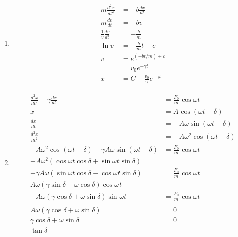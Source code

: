 \documentclass{article}
\begin{document}
\begin{enumerate}
  \item

        \begin{align*}
          m \frac{d^2 x}{d t^2}       & = -b \frac{d x}{d t}                   \\
          m \frac{d v}{d t}           & = -b v                                 \\
          \frac{1}{v} \frac{d v}{d t} & = -\frac{b}{m}                         \\
          \ln v                       & = -\frac{b}{m} t + c                   \\
          v                           & = e^{(-b t / m) + c}                   \\
                                      & = v_0 e^{-\gamma t}                    \\
          x                           & = C - \frac{v_0}{\gamma} e^{-\gamma t}
        \end{align*}

  \item

        \begin{align*}
          \frac{d^2 x}{d t^2} + \gamma \frac{d x}{d t}                                    & = \frac{F_0}{m} \cos \omega t          \\
          x                                                                               & = A \cos (\omega t - \delta)           \\
          \frac{d x}{d t}                                                                 & = -A \omega \sin (\omega t - \delta)   \\
          \frac{d^2 x}{d t^2}                                                             & = -A \omega^2 \cos (\omega t - \delta) \\
          -A \omega^2 \cos (\omega t - \delta) - \gamma A \omega \sin (\omega t - \delta) & = \frac{F_0}{m} \cos \omega t          \\
          -A \omega^2 (\cos \omega t \cos \delta + \sin \omega t \sin \delta)             &                                        \\
          - \gamma A \omega (\sin \omega t \cos \delta - \cos \omega t \sin \delta)       & = \frac{F_0}{m} \cos \omega t          \\
          A \omega (\gamma \sin \delta - \omega \cos \delta) \cos \omega t                &                                        \\
          - A \omega (\gamma \cos \delta + \omega \sin \delta) \sin \omega t              & = \frac{F_0}{m} \cos \omega t          \\ \\
          A \omega (\gamma \cos \delta + \omega \sin \delta)                              & = 0                                    \\
          \gamma \cos \delta + \omega \sin \delta                                         & = 0                                    \\
          \tan \delta
        \end{align*}


\end{enumerate}
\end{document}
